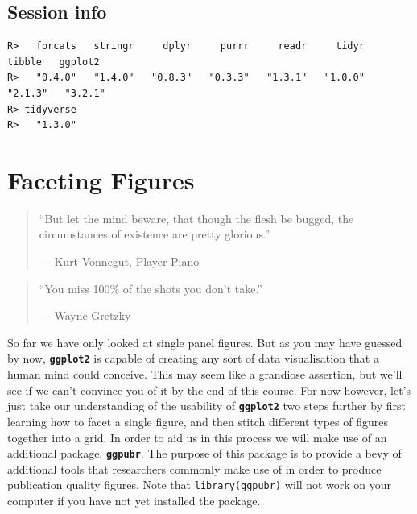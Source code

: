 \documentclass[
]{book}
\newenvironment{Shaded}{\begin{snugshade}}{\end{snugshade}}
\newcommand{\KeywordTok}[1]{\textcolor[rgb]{0.13,0.29,0.53}{\textbf{#1}}}
\newcommand{\NormalTok}[1]{#1}
\newcommand{\OperatorTok}[1]{\textcolor[rgb]{0.81,0.36,0.00}{\textbf{#1}}}
\newcommand{\StringTok}[1]{\textcolor[rgb]{0.31,0.60,0.02}{#1}}
\begin{document}
\hypertarget{session-info-3}{%
\section{Session info}\label{session-info-3}}

\begin{Shaded}
\end{Shaded}

\begin{verbatim}
R>   forcats   stringr     dplyr     purrr     readr     tidyr    tibble   ggplot2 
R>   "0.4.0"   "1.4.0"   "0.8.3"   "0.3.3"   "1.3.1"   "1.0.0"   "2.1.3"   "3.2.1" 
R> tidyverse 
R>   "1.3.0"
\end{verbatim}

\hypertarget{faceting}{%
\chapter{Faceting Figures}\label{faceting}}

\begin{quote}
``But let the mind beware, that though the flesh be bugged, the circumstances of existence are pretty glorious.''

--- Kurt Vonnegut, Player Piano
\end{quote}

\begin{quote}
``You miss 100\% of the shots you don't take.''

--- Wayne Gretzky
\end{quote}

So far we have only looked at single panel figures. But as you may have guessed by now, \textbf{\texttt{ggplot2}} is capable of creating any sort of data visualisation that a human mind could conceive. This may seem like a grandiose assertion, but we'll see if we can't convince you of it by the end of this course. For now however, let's just take our understanding of the usability of \textbf{\texttt{ggplot2}} two steps further by first learning how to facet a single figure, and then stitch different types of figures together into a grid. In order to aid us in this process we will make use of an additional package, \textbf{\texttt{ggpubr}}. The purpose of this package is to provide a bevy of additional tools that researchers commonly make use of in order to produce publication quality figures. Note that \texttt{library(ggpubr)} will not work on your computer if you have not yet installed the package.
\end{document}
